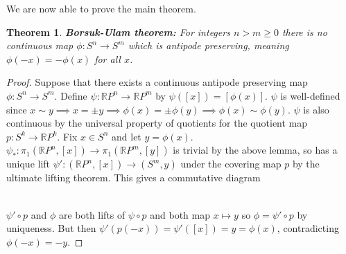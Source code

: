 \documentclass{report}
\newtheorem{theorem}{Theorem}
\begin{document}
\noindent We are now able to prove the main theorem.
\begin{theorem}
\textbf{Borsuk-Ulam theorem:} For integers $n>m\geq 0$ there is no continuous map $\phi\colon S^n\to S^m$ which is antipode preserving, meaning $\phi(-x)=-\phi(x)$ for all $x$.
\end{theorem}
\begin{proof}
Suppose that there exists a continuous antipode preserving map $\phi:S^n\rightarrow S^m$. Define $\psi\colon\mathbb{R}P^n\to \mathbb{R}P^m$ by $\psi([x])=[\phi(x)]$. $\psi$ is well-defined since $x\sim y \implies x=\pm y \implies \phi(x)=\pm\phi(y) \implies \phi(x)\sim\phi(y)$. $\psi$ is also continuous by the universal property of quotients for the quotient map $p:S^k\rightarrow \mathbb{R}P^k$.
Fix $x\in S^n$ and let $y=\phi(x)$. $\psi_*\colon\pi_1(\mathbb{R}P^n,[x])\to \pi_1(\mathbb{R}P^m,[y])$ is trivial by the above lemma, so has a unique lift $\psi'\colon(\mathbb{R}P^n,[x])\to (S^m,y)$ under the covering map $p$ by the ultimate lifting theorem. This gives a commutative diagram

\\
$\psi' \circ p$ and $\phi$ are both lifts of $\psi \circ p$ and both map $x\mapsto y$ so $\phi = \psi'\circ p$ by uniqueness. But then $\psi'(p(-x))=\psi'([x])=y=\phi(x)$, contradicting $\phi(-x)=-y$.
\end{proof}
\end{document}
